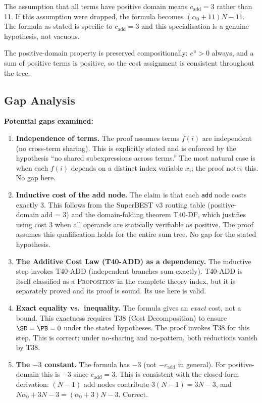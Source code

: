 \documentclass[12pt,a4paper]{article}
\theoremstyle{definition}
\begin{document}
The assumption that all terms have positive domain means $c_{\mathrm{add}} = 3$
rather than 11.  If this assumption were dropped, the formula becomes
$(\alpha_0 + 11)N - 11$.  The formula as stated is specific to
$c_{\mathrm{add}} = 3$ and this specialisation is a genuine hypothesis,
not vacuous.

The positive-domain property is preserved compositionally: $e^u > 0$ always,
and a sum of positive terms is positive, so the cost assignment is consistent
throughout the tree.

\subsection{Gap Analysis}

\textbf{Potential gaps examined:}

\begin{enumerate}
  \item \textbf{Independence of terms.}  The proof assumes terms $f(i)$ are
        independent (no cross-term sharing).  This is explicitly stated and
        is enforced by the hypothesis ``no shared subexpressions across terms.''
        The most natural case is when each $f(i)$ depends on a distinct index
        variable $x_i$; the proof notes this.  No gap here.

  \item \textbf{Inductive cost of the add node.}  The claim is that each
        \texttt{add} node costs exactly 3.  This follows from the SuperBEST v3
        routing table (positive-domain add = 3) and the domain-folding theorem
        T40-DF, which justifies using cost 3 when all operands are
        statically verifiable as positive.  The proof assumes this
        qualification holds for the entire sum tree.  No gap for the stated
        hypothesis.

  \item \textbf{The Additive Cost Law (T40-ADD) as a dependency.}  The
        inductive step invokes T40-ADD (independent branches sum exactly).
        T40-ADD is itself classified as a \textsc{Proposition} in the
        complete theory index, but it is separately proved and its proof
        is sound.  Its use here is valid.

  \item \textbf{Exact equality vs.\ inequality.}  The formula gives an
        \emph{exact} cost, not a bound.  This exactness requires T38
        (Cost Decomposition) to ensure $\SD = \PB = 0$ under the stated
        hypotheses.  The proof invokes T38 for this step.  This is correct:
        under no-sharing and no-pattern, both reductions vanish by T38.

  \item \textbf{The $-3$ constant.}  The formula has $-3$ (not $-c_{\mathrm{add}}$
        in general).  For positive-domain this is $-3$ since $c_{\mathrm{add}} = 3$.
        This is consistent with the closed-form derivation: $(N-1)$ add nodes
        contribute $3(N-1) = 3N - 3$, and $N\alpha_0 + 3N - 3 = (\alpha_0+3)N - 3$.
        Correct.
\end{enumerate}
\end{document}
